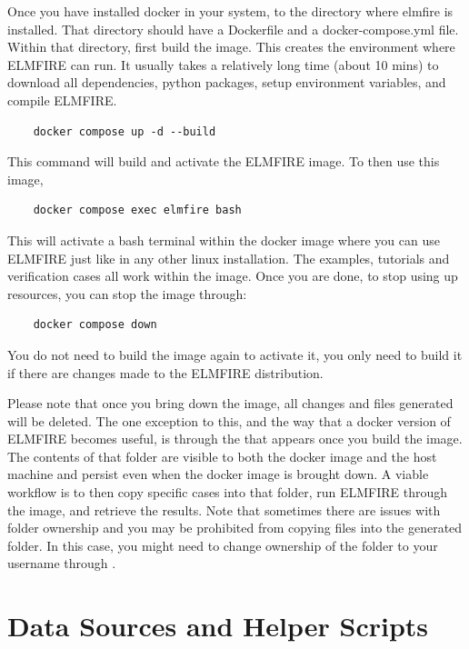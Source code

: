 Once you have installed docker in your system,  to the directory where elmfire is installed. That directory should have a Dockerfile and a docker-compose.yml file. Within that directory, first build the image. This creates the environment where ELMFIRE can run. It usually takes a relatively long time (about 10 mins) to download all dependencies, python packages, setup environment variables, and compile ELMFIRE. 

\begin{verbatim}
    docker compose up -d --build
\end{verbatim}

This command will build and activate the ELMFIRE image. To then use this image, 

\begin{verbatim}
    docker compose exec elmfire bash
\end{verbatim}

This will activate a bash terminal within the docker image where you can use ELMFIRE just like in any other linux installation. The examples, tutorials and verification cases all work within the image. Once you are done, to stop using up resources, you can stop the image through:

\begin{verbatim}
    docker compose down
\end{verbatim}

You do not need to build the image again to activate it, you only need to build it if there are changes made to the ELMFIRE distribution.

Please note that once you bring down the image, all changes and files generated will be deleted. The one exception to this, and the way that a docker version of ELMFIRE becomes useful, is through the  that appears once you build the image. The contents of that folder are visible to both the docker image and the host machine and persist even when the docker image is brought down. A viable workflow is to then copy specific cases into that folder, run ELMFIRE through the image, and retrieve the results. Note that sometimes there are issues with folder ownership and you may be prohibited from copying files into the generated folder. In this case, you might need to change ownership of the folder to your username through .

\section{Data Sources and Helper Scripts}

